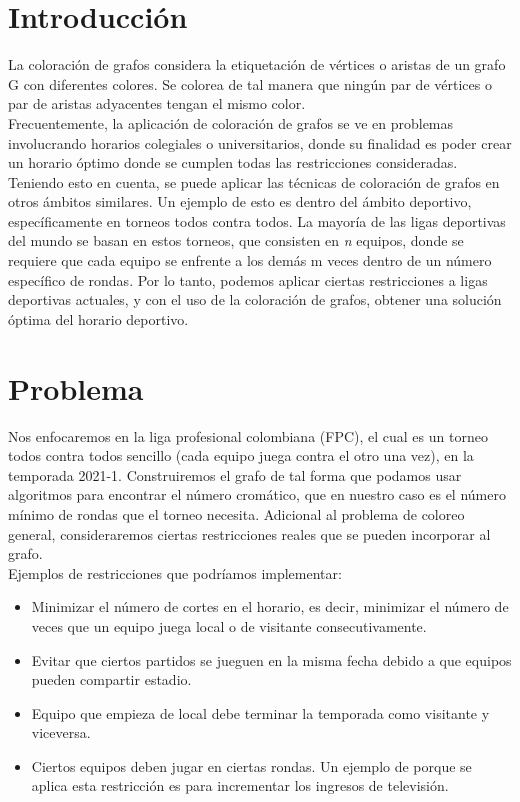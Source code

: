 \documentclass[11pt]{article}
\begin{document}
    \begin{multicols}{2}
    \setcounter{page}{1}

        \section{Introducción}
            La coloración de grafos considera la etiquetación de vértices o aristas de un grafo G con diferentes colores. 
            Se colorea de tal manera que ningún par de vértices o par de aristas adyacentes tengan el mismo color.\\
            Frecuentemente, la aplicación de coloración de grafos se ve en problemas involucrando horarios colegiales o 
            universitarios, donde su finalidad es poder crear un horario óptimo donde se cumplen todas las restricciones consideradas. 
            Teniendo esto en cuenta, se puede aplicar las técnicas de coloración de grafos en otros ámbitos similares. 
            Un ejemplo de esto es dentro del ámbito deportivo, específicamente en torneos todos contra todos. La mayoría de las 
            ligas deportivas del mundo se basan en estos torneos, que consisten en \textit{n} equipos, donde se requiere que cada equipo se 
            enfrente a los demás m veces dentro de un número específico de rondas. Por lo tanto, podemos aplicar ciertas 
            restricciones a ligas deportivas actuales, y con el uso de la coloración de grafos, obtener una solución óptima 
            del horario deportivo. 

        \section{Problema}
            Nos enfocaremos en la liga profesional colombiana (FPC), el cual es un torneo todos contra todos sencillo 
            (cada equipo juega contra el otro una vez), en la temporada 2021-1. Construiremos el grafo de tal forma que podamos 
            usar algoritmos para encontrar el número cromático, que en nuestro caso es el número mínimo de rondas que el torneo necesita.
            Adicional al problema de coloreo general, consideraremos ciertas restricciones reales que se pueden incorporar al grafo.\\[10pt]
            Ejemplos de restricciones que podríamos implementar:

            \begin{itemize}
                \item Minimizar el número de cortes en el horario, es decir, minimizar el número de veces que un equipo juega local o de visitante consecutivamente.
                \item Evitar que ciertos partidos se jueguen en la misma fecha debido a que equipos pueden compartir estadio.
                \item Equipo que empieza de local debe terminar la temporada como visitante y viceversa.
                \item Ciertos equipos deben jugar en ciertas rondas. Un ejemplo de porque se aplica esta restricción es para incrementar los ingresos de televisión.
            \end{itemize}
   

\end{multicols}
\end{document}
